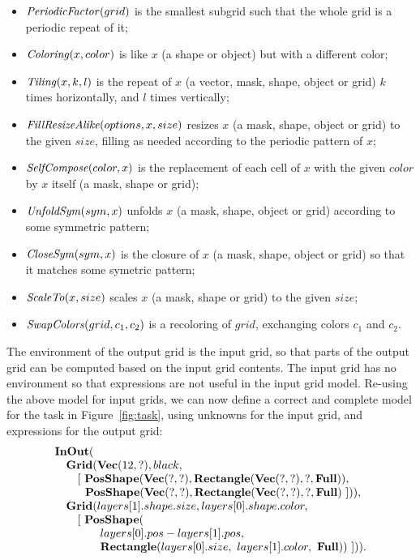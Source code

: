 \documentclass[a4paper]{llncs}
\begin{document}
\begin{itemize}
\item ${\it PeriodicFactor}(grid)$ is the smallest subgrid such that the whole grid is a periodic repeat of it;
\item ${\it Coloring}(x,color)$ is like $x$ (a shape or object) but with a different color;
\item ${\it Tiling}(x,k,l)$ is the repeat of $x$ (a vector, mask, shape, object or grid) $k$ times horizontally, and $l$ times vertically;
\item ${\it FillResizeAlike}(options,x,size)$ resizes $x$ (a mask, shape, object or grid) to the given $size$, filling as needed according to the periodic pattern of $x$;
\item ${\it SelfCompose}(color,x)$ is the replacement of each cell of
  $x$ with the given $color$ by $x$ itself (a mask, shape or grid);
\item ${\it UnfoldSym}(sym,x)$ unfolds $x$ (a mask, shape, object or grid) according to some symmetric pattern;
\item ${\it CloseSym}(sym,x)$ is the closure of $x$ (a mask, shape, object or grid) so that it matches some symetric pattern;
\item ${\it ScaleTo}(x,size)$ scales $x$ (a mask, shape or grid) to the given $size$;
\item ${\it SwapColors}(grid,c_1,c_2)$ is a recoloring of $grid$, exchanging colors $c_1$ and $c_2$.
\end{itemize}

The environment of the output grid is the input grid, so that parts of
the output grid can be computed based on the input grid contents. The
input grid has no environment so that expressions are not useful in
the input grid model.
%
Re-using the above model for input grids, we can now define a correct
and complete model for the task in Figure~\ref{fig:task}, using
unknowns for the input grid, and expressions for the output grid:
\[\begin{array}{l}
    {\bf InOut}( \\
    \quad {\bf Grid}({\bf Vec}(12,?), black,\\
    \quad \quad [~{\bf PosShape}({\bf Vec}(?,?), {\bf Rectangle}({\bf Vec}(?, ?), ?, {\bf Full})),\\
    \quad \quad ~~{\bf PosShape}({\bf Vec}(?,?), {\bf Rectangle}({\bf Vec}(?, ?), ?, {\bf Full})~])), \\
    \quad {\bf Grid}(layers[1].shape.size, layers[0].shape.color, \\
    \quad \quad [~ {\bf PosShape}(\\
    \quad \quad \quad \quad layers[0].pos - layers[1].pos, \\
    \quad \quad \quad \quad {\bf Rectangle}(layers[0].size,\ layers[1].color,\ {\bf Full})) ~])).
  \end{array} \]
\end{document}
